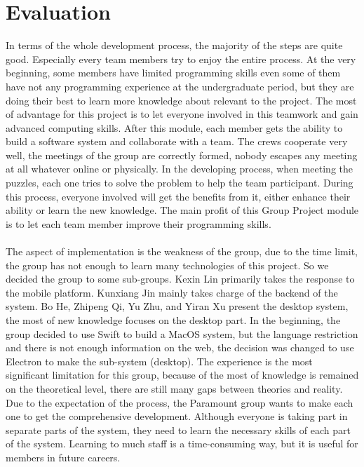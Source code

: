 \documentclass[11pt]{article}
\begin{document}
\section{Evaluation}
In terms of the whole development process, the majority of the steps are quite good. Especially every team members try to enjoy the entire process. At the very beginning, some members have limited programming skills even some of them have not any programming experience at the undergraduate period, but they are doing their best to learn more knowledge about relevant to the project. The most of advantage for this project is to let everyone involved in this teamwork and gain advanced computing skills. After this module, each member gets the ability to build a software system and collaborate with a team. The crews cooperate very well, the meetings of the group are correctly formed,  nobody escapes any meeting at all whatever online or physically. In the developing process, when meeting the puzzles, each one tries to solve the problem to help the team participant. During this process, everyone involved will get the benefits from it, either enhance their ability or learn the new knowledge. The main profit of this Group Project module is to let each team member improve their programming skills. 
\\
\\
The aspect of implementation is the weakness of the group, due to the time limit, the group has not enough to learn many technologies of this project. So we decided the group to some sub-groups. Kexin Lin primarily takes the response to the mobile platform. Kunxiang Jin mainly takes charge of the backend of the system. Bo He, Zhipeng Qi, Yu Zhu, and Yiran Xu present the desktop system, the most of new knowledge focuses on the desktop part. In the beginning, the group decided to use Swift to build a MacOS system, but the language restriction and there is not enough information on the web, the decision was changed to use Electron to make the sub-system (desktop).  The experience is the most significant limitation for this group, because of the most of knowledge is remained on the theoretical level, there are still many gaps between theories and reality. Due to the expectation of the process, the Paramount group wants to make each one to get the comprehensive development. Although everyone is taking part in separate parts of the system, they need to learn the necessary skills of each part of the system. Learning to much staff is a time-consuming way, but it is useful for members in future careers.
\\
\end{document}
